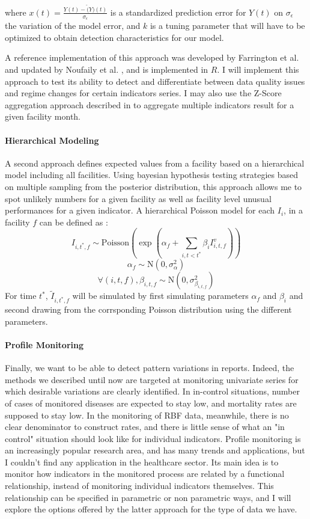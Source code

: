 where $x(t) = \frac{Y(t) - \hat(Y)(t)}{\sigma_\epsilon}$ is a standardized prediction error for $Y(t)$ on $\sigma_\epsilon$ the variation of the model error, and $k$ is a tuning parameter that will have to be optimized to obtain detection characteristics for our model.

A reference implementation of this approach was developed by Farrington et al. \cite{farrington_statistical_1996} and updated by Noufaily et al. \cite{noufaily_improved_2013}, and is implemented in $R$. I will implement this approach to test its ability to detect and differentiate between data quality issues and regime changes for certain indicators series. I may also use the Z-Score aggregation approach described in \cite{bardsley_using_2009} to aggregate multiple indicators result for a given facility month.

\paragraph{Hierarchical Modeling} A second approach defines expected values from a facility based on a hierarchical model including all facilities. Using bayesian hypothesis testing strategies based on multiple sampling from the posterior distribution, this approach allows me to spot unlikely numbers for a given facility as well as facility level unusual performances for a given indicator\cite{ohlssen_hierarchical_2007}. A hierarchical Poisson model for each $I_i$, in a facility $f$ can be defined as :
$$ I_{i,t^{*},f} \sim \mathrm{Poisson}(\exp{(\alpha_f + \sum_{i, t < t^{*}}{\beta_{i} I^v_{i,t,f}})})$$
$$\alpha_f \sim \mathrm{N}(0 , \sigma^2_\alpha)$$
$$ \forall (i , t , f) , \beta_{i,t,f} \sim \mathrm{N}(0 , \sigma^2_{\beta_{i,t,f}}) $$
For time $t^{*}$, $\tilde{I}_{i,t^{*},f}$ will be simulated by first simulating parameters $\alpha_f$ and $\beta_i$ and second drawing from the corrsponding Poisson distribution using the different parameters.

\paragraph{Profile Monitoring} Finally, we want to be able to detect pattern variations in reports. Indeed, the methods we described until now are targeted at monitoring univariate series for which desirable variations are clearly identified. In in-control situations, number of cases of monitored diseases are expected to stay low, and mortality rates are supposed to stay low. In the monitoring of RBF data, meanwhile, there is no clear denominator to construct rates, and there is little sense of what an "in control" situation should look like for individual indicators. Profile  monitoring is an increasingly popular research area\cite{woodall_current_2014}, and has many trends and applications, but I couldn't find any application in the healthcare sector. Its main idea is to monitor how indicators in the monitored process are related by a functional relationship, instead of monitoring individual indicators themselves. This relationship can be specified in parametric\cite{mahmoud_simple_2011} or non parametric ways\cite{chicken_nonparametric_2011}, and I will explore the options offered by the latter approach for the type of data we have.

